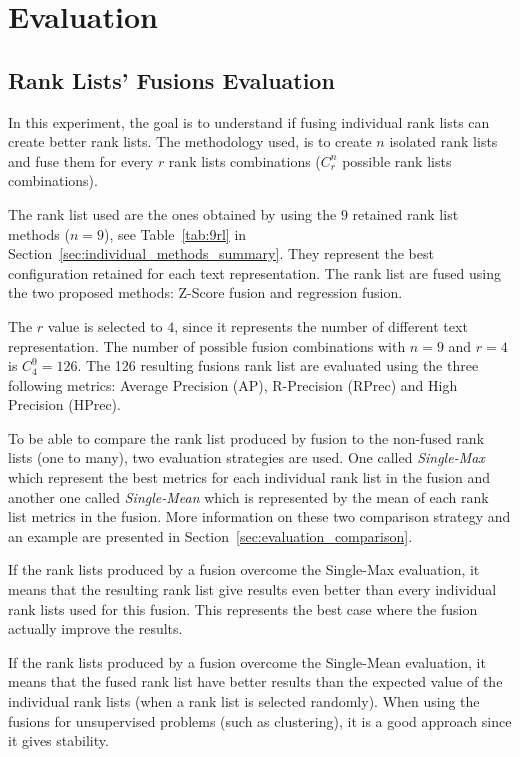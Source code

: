 \section{Evaluation}

\subsection{Rank Lists' Fusions Evaluation \label{sec:eval_fusion}}

In this experiment, the goal is to understand if fusing individual rank lists can create better rank lists.
The methodology used, is to create $n$ isolated rank lists and fuse them for every $r$ rank lists combinations ($C^n_r$ possible rank lists combinations).

The rank list used are the ones obtained by using the $9$ retained rank list methods ($n=9$), see Table~\ref{tab:9rl} in Section~\ref{sec:individual_methods_summary}.
They represent the best configuration retained for each text representation.
The rank list are fused using the two proposed methods: Z-Score fusion and regression fusion.

The $r$ value is selected to $4$, since it represents the number of different text representation.
The number of possible fusion combinations with $n=9$ and $r=4$ is $C^{9}_{4} = 126$.
The 126 resulting fusions rank list are evaluated using the three following metrics: Average Precision (AP), R-Precision (RPrec) and High Precision (HPrec).

To be able to compare the rank list produced by fusion to the non-fused rank lists (one to many), two evaluation strategies are used.
One called \textit{Single-Max} which represent the best metrics for each individual rank list in the fusion and another one called \textit{Single-Mean} which is represented by the mean of each rank list metrics in the fusion.
More information on these two comparison strategy and an example are presented in Section~\ref{sec:evaluation_comparison}.

If the rank lists produced by a fusion overcome the Single-Max evaluation, it means that the resulting rank list give results even better than every individual rank lists used for this fusion.
This represents the best case where the fusion actually improve the results.

If the rank lists produced by a fusion overcome the Single-Mean evaluation, it means that the fused rank list have better results than the expected value of the individual rank lists (when a rank list is selected randomly).
When using the fusions for unsupervised problems (such as clustering), it is a good approach since it gives stability.

